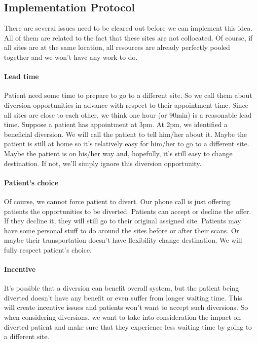 \subsection{Implementation Protocol}

There are several issues need to be cleared out before we can implement this idea. All of them are related to the fact that these sites are not collocated. Of course, if all sites are at the same location, all resources are already perfectly pooled together and we won't have any work to do.

\paragraph{Lead time} Patient need some time to prepare to go to a different site.  So we call them about diversion opportunities in advance with respect to their appointment time. Since all sites are close to each other, we think one hour (or 90min) is a reasonable lead time. Suppose a patient has appointment at 3pm. At 2pm, we identified a beneficial diversion. We will call the patient to tell him/her about it. Maybe the patient is still at home so it's relatively easy for him/her to go to a different site. Maybe the patient is on his/her way and, hopefully, it's still easy to change destination. If not, we'll simply ignore this diversion opportunity.

\paragraph{Patient's choice} Of course, we cannot force patient to divert. Our phone call is just offering patients the opportunities to be diverted. Patients can accept or decline the offer. If they decline it, they will still go to their original assigned site. Patients may have some personal stuff to do around the sites before or after their scans. Or maybe their transportation doesn't have flexibility change destination. We will fully respect patient's choice.

\paragraph{Incentive} It's possible that a diversion can benefit overall system, but the patient being diverted doesn't have any benefit or even suffer from longer waiting time. This will create incentive issues and patients won't want to accept such diversions. So when considering diversions, we want to take into consideration the impact on diverted patient and make sure that they experience less waiting time by going to a different site.

